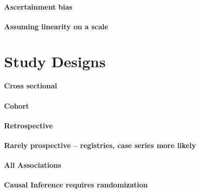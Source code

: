 \documentclass[]{book}
\theoremstyle{definition}
\theoremstyle{definition}
\theoremstyle{definition}
\theoremstyle{remark}
\begin{document}
\hypertarget{ascertainment-bias}{%
\subsubsection{Ascertainment bias}\label{ascertainment-bias}}

\hypertarget{assuming-linearity-on-a-scale}{%
\subsubsection{Assuming linearity on a
scale}\label{assuming-linearity-on-a-scale}}

\hypertarget{study-designs}{%
\chapter{Study Designs}\label{study-designs}}

\hypertarget{cross-sectional}{%
\subsubsection{Cross sectional}\label{cross-sectional}}

\hypertarget{cohort}{%
\subsubsection{Cohort}\label{cohort}}

\hypertarget{retrospective}{%
\subsubsection{Retrospective}\label{retrospective}}

\hypertarget{rarely-prospective-registries-case-series-more-likely}{%
\subsubsection{Rarely prospective -- registries, case series more
likely}\label{rarely-prospective-registries-case-series-more-likely}}

\hypertarget{all-associations}{%
\subsubsection{All Associations}\label{all-associations}}

\hypertarget{causal-inference-requires-randomization}{%
\subsubsection{Causal Inference requires
randomization}\label{causal-inference-requires-randomization}}
\end{document}

